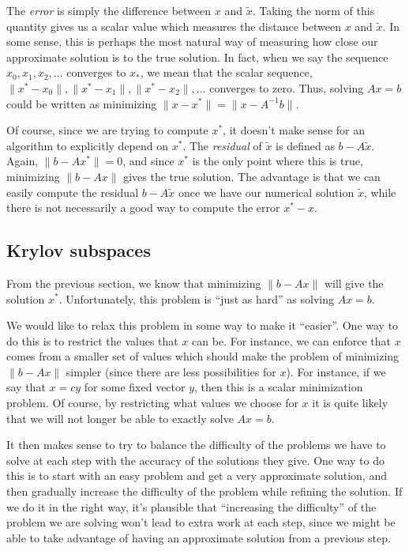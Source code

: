 The \emph{error} is simply the difference between \(x\) and
\(\tilde{x}\). Taking the norm of this quantity gives us a scalar value
which measures the distance between \(x\) and \(\tilde{x}\). In some
sense, this is perhaps the most natural way of measuring how close our
approximate solution is to the true solution. In fact, when we say the
sequence \(x_0,x_1,x_2,\ldots\) converges to \(x_*\), we mean that the
scalar sequence,\(\|x^*-x_0\|,\|x^*-x_1\|,\|x^*-x_2\|,\ldots\) converges
to zero. Thus, solving \(Ax=b\) could be written as minimizing
\(\|x - x^*\| = \|x-A^{-1}b\|\).

Of course, since we are trying to compute \(x^*\), it doesn't make sense
for an algorithm to explicitly depend on \(x^*\). The \emph{residual} of
\(\tilde{x}\) is defined as \(b-A\tilde{x}\). Again, \(\|b-Ax^*\| = 0\),
and since \(x^*\) is the only point where this is true, minimizing
\(\|b-Ax\|\) gives the true solution. The advantage is that we can
easily compute the residual \(b-A\tilde{x}\) once we have our numerical
solution \(\tilde{x}\), while there is not necessarily a good way to
compute the error \(x^*-x\).

\hypertarget{krylov-subspaces}{%
\subsection{Krylov subspaces}\label{krylov-subspaces}}

From the previous section, we know that minimizing \(\|b-Ax\|\) will
give the solution \(x^*\). Unfortunately, this problem is ``just as
hard'' as solving \(Ax=b\).

We would like to relax this problem in some way to make it ``easier''.
One way to do this is to restrict the values that \(x\) can be. For
instance, we can enforce that \(x\) comes from a smaller set of values
which should make the problem of minimizing \(\|b-Ax\|\) simpler (since
there are less possibilities for \(x\)). For instance, if we say that
\(x = cy\) for some fixed vector \(y\), then this is a scalar
minimization problem. Of course, by restricting what values we choose
for \(x\) it is quite likely that we will not longer be able to exactly
solve \(Ax=b\).

It then makes sense to try to balance the difficulty of the problems we
have to solve at each step with the accuracy of the solutions they give.
One way to do this is to start with an easy problem and get a very
approximate solution, and then gradually increase the difficulty of the
problem while refining the solution. If we do it in the right way, it's
plausible that ``increasing the difficulty'' of the problem we are
solving won't lead to extra work at each step, since we might be able to
take advantage of having an approximate solution from a previous step.

